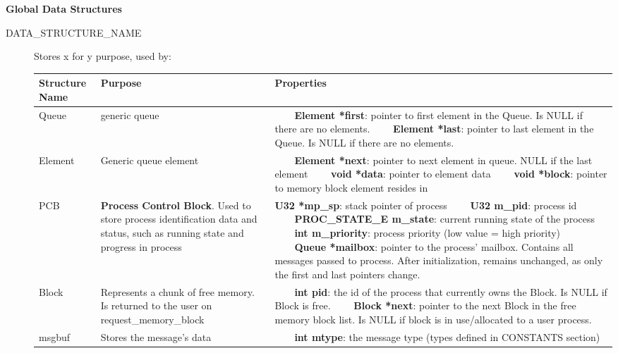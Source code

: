 \documentclass[11pt, oneside]{article}
\newcommand{\tabitem}{~~\llap{\textbullet}~~}
\begin{document}
{\bf Global Data Structures}
\begin{description}
\item [DATA\_STRUCTURE\_NAME] Stores x for y purpose, used by:
\newline
\begin{longtable}{|L{2cm}|L{5cm}|L{5cm}|} \hline
\textbf{Structure Name} & \textbf{Purpose} & \textbf{Properties} \\ \hline
Queue& generic queue & 
\tabitem \textbf{Element *first}: pointer to first element in the Queue. Is NULL if there are no elements.
\newline
\tabitem \textbf{Element *last}: pointer to last element in the Queue. Is NULL if there are no elements.\\ \hline
Element & Generic queue element & 
\tabitem \textbf{Element *next}: pointer to next element in queue. NULL if the last element
\newline
\tabitem \textbf{void *data}: pointer to element data 
\newline
\tabitem \textbf{void *block}: pointer to memory block element resides in \\ \hline
PCB & \textbf{Process Control Block}. Used to store process identification data and status, such as running state and progress in process& \textbf{U32 *mp\_sp}: stack pointer of process \newline
\tabitem \textbf{U32 m\_pid}: process id \newline
\tabitem \textbf{PROC\_STATE\_E m\_state}: current running state of the process \newline
\tabitem \textbf{int m\_priority}: process priority (low value = high priority) \newline
\tabitem \textbf{Queue *mailbox}: pointer to the process' mailbox. Contains all messages passed to process. After initialization, remains unchanged, as only the first and last pointers change.\\ \hline
Block & Represents a chunk of free memory. Is returned to the user on request\_memory\_block & 
\tabitem \textbf{int pid}: the id of the process that currently owns the Block. Is NULL if Block is free. \newline
\tabitem \textbf{Block *next}: pointer to the next Block in the free memory block list. Is NULL if block is in use/allocated to a user process. \\ \hline
msgbuf&Stores the message's data& 
\tabitem \textbf{int mtype}: the message type (types defined in CONSTANTS section) \newline 

\end{longtable}
\end{description}
\end{document}

